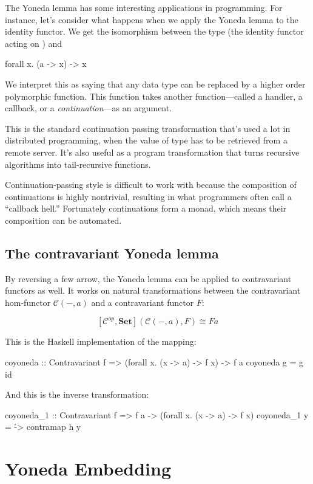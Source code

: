\documentclass[DaoFP]{subfiles}
\begin{document}
The Yoneda lemma has some interesting applications in programming. For instance, let's consider what happens when we apply the Yoneda lemma to the identity functor. We get the isomorphism between the type  (the identity functor acting on ) and
\begin{haskell}
forall x. (a -> x) -> x
\end{haskell}
We interpret this as saying that any data type  can be replaced by a higher order polymorphic function. This function takes another function---called a handler, a callback, or a \emph{continuation}---as an argument. 

This is the standard continuation passing transformation that's used a lot in distributed programming, when the value of type  has to be retrieved from a remote server. It's also useful as a program transformation that turns recursive algorithms into tail-recursive functions.

Continuation-passing style is difficult to work with because the composition of continuations is highly nontrivial, resulting in what programmers often call a ``callback hell.'' Fortunately continuations form a monad, which means their composition can be automated.

\subsection{The contravariant Yoneda lemma}

By reversing a few arrow, the Yoneda lemma can be applied to contravariant functors as well. It works on natural transformations between the contravariant hom-functor $\mathcal{C}(-, a)$ and a contravariant functor $F$:

\[ [\mathcal{C}^{op}, \mathbf{Set}]( \mathcal{C}(-, a), F) \cong F a \]

This is the Haskell implementation of the mapping:
\begin{haskell}
coyoneda :: Contravariant f => (forall x. (x -> a) -> f x) -> f a
coyoneda g = g id
\end{haskell}
And this is the inverse transformation:
\begin{haskell}
coyoneda_1 :: Contravariant f => f a -> (forall x. (x -> a) -> f x)
coyoneda_1 y = \h -> contramap h y
\end{haskell}

\section{Yoneda Embedding}
\end{document}
